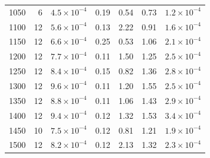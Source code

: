 \begin{longtable}{rrrrrrr}
1050 & 6 & $4.5\times10^{-4}$ & 0.19 & 0.54 & 0.73 & $1.2\times10^{-4}$ \\
1100 & 12 & $5.6\times10^{-4}$ & 0.13 & 2.22 & 0.91 & $1.6\times10^{-4}$ \\
1150 & 12 & $6.6\times10^{-4}$ & 0.25 & 0.53 & 1.06 & $2.1\times10^{-4}$ \\
1200 & 12 & $7.7\times10^{-4}$ & 0.11 & 1.50 & 1.25 & $2.5\times10^{-4}$ \\
1250 & 12 & $8.4\times10^{-4}$ & 0.15 & 0.82 & 1.36 & $2.8\times10^{-4}$ \\
1300 & 12 & $9.6\times10^{-4}$ & 0.11 & 1.20 & 1.55 & $2.5\times10^{-4}$ \\
1350 & 12 & $8.8\times10^{-4}$ & 0.11 & 1.06 & 1.43 & $2.9\times10^{-4}$ \\
1400 & 12 & $9.4\times10^{-4}$ & 0.12 & 1.32 & 1.53 & $3.4\times10^{-4}$ \\
1450 & 10 & $7.5\times10^{-4}$ & 0.12 & 0.81 & 1.21 & $1.9\times10^{-4}$ \\
1500 & 12 & $8.2\times10^{-4}$ & 0.12 & 2.13 & 1.32 & $2.3\times10^{-4}$ \\
\bottomrule
\end{longtable}
